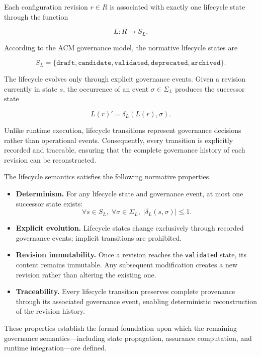 \documentclass[10pt]{article}
\begin{document}
Each configuration revision \(r \in R\) is associated with exactly one lifecycle state through the function

\[
L : R \rightarrow S_L.
\]

According to the ACM governance model, the normative lifecycle states are

\[
S_L=
\{
\texttt{draft},
\texttt{candidate},
\texttt{validated},
\texttt{deprecated},
\texttt{archived}
\}.
\]

The lifecycle evolves only through explicit governance events. Given a revision currently in state \(s\), the occurrence of an event
\(\sigma \in \Sigma_L\)
produces the successor state

\[
L(r)'=\delta_L(L(r),\sigma).
\]

Unlike runtime execution, lifecycle transitions represent governance decisions rather than operational events. Consequently, every transition is explicitly recorded and traceable, ensuring that the complete governance history of each revision can be reconstructed.

The lifecycle semantics satisfies the following normative properties.

\begin{itemize}
    \item \textbf{Determinism.} For any lifecycle state and governance event, at most one successor state exists:
    \[
    \forall s\in S_L,\;
    \forall\sigma\in\Sigma_L,\;
    |\delta_L(s,\sigma)|\le1.
    \]

    \item \textbf{Explicit evolution.}
    Lifecycle states change exclusively through recorded governance events; implicit transitions are prohibited.

    \item \textbf{Revision immutability.}
    Once a revision reaches the \texttt{validated} state, its content remains immutable. Any subsequent modification creates a new revision rather than altering the existing one.

    \item \textbf{Traceability.}
    Every lifecycle transition preserves complete provenance through its associated governance event, enabling deterministic reconstruction of the revision history.
\end{itemize}

These properties establish the formal foundation upon which the remaining governance semantics—including state propagation, assurance computation, and runtime integration—are defined.
\end{document}
